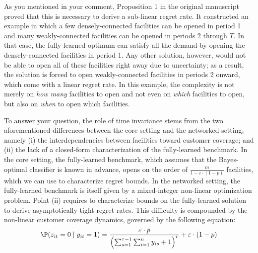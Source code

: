 \documentclass[11pt]{article}
\begin{document}
As you mentioned in your comment, Proposition 1 in the original manuscript proved that this is necessary to derive a sub-linear regret rate. It constructed an example in which a few densely-connected facilities can be opened in period 1 and many weakly-connected facilities can be opened in periods 2 through $T$. In that case, the fully-learned optimum can satisfy all the demand by opening the densely-connected facilities in period 1. Any other solution, however, would not be able to open all of these facilities right away due to uncertainty; as a result, the solution is forced to open weakly-connected facilities in periods 2 onward, which come with a linear regret rate. In this example, the complexity is not merely on \textit{how many} facilities to open and not even on \textit{which} facilities to open, but also on \textit{when} to open which facilities.

To answer your question, the role of time invariance stems from the two aforementioned differences between the core setting and the networked setting, namely (i) the interdependencies between facilities toward customer coverage; and (ii) the lack of a closed-form characterization of the fully-learned benchmark. In the core setting, the fully-learned benchmark, which assumes that the Bayes-optimal classifier is known in advance, opens on the order of $\frac{m}{1-\varepsilon\cdot(1-p)}$ facilities, which we can use to characterize regret bounds. In the networked setting, the fully-learned benchmark is itself given by a mixed-integer non-linear optimization problem. Point (ii) requires to characterize bounds on the fully-learned solution to derive asymptotically tight regret rates. This difficulty is compounded by the non-linear customer coverage dynamics, governed by the following equation:
$$\P(z_{it}=0 \mid y_{it}=1)=\frac{\varepsilon\cdot p}{\left(\sum_{s=1}^{\tau-1} \sum_{i=1}^n y_{is} + 1\right)^r}+\varepsilon\cdot(1-p)$$
\end{document}
